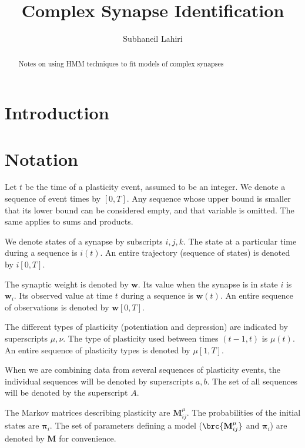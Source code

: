 \documentclass[12pt]{article}
\title{Complex Synapse Identification}%
\author{Subhaneil Lahiri}%
\newcommand{\pib}{\boldsymbol{\pi}}
\newcommand{\w}{\mathbf{w}}
\newcommand{\M}{\mathbf{M}}
\begin{document}
\maketitle
\begin{abstract}
  Notes on using HMM techniques to fit models of complex synapses
\end{abstract}

\section{Introduction \label{sec:intro}}






\section{Notation \label{sec:notation}}

Let $t$ be the time of a plasticity event, assumed to be an integer. 
We denote a sequence of event times by $[0,T]$.
Any sequence whose upper bound is smaller that its lower bound can be considered empty, and that variable is omitted.
The same applies to sums and products.

We denote states of a synapse by subscripts $i,j,k$. 
The state at a particular time during a sequence is $i(t)$.
An entire trajectory (sequence of states) is denoted by $i[0,T]$.

The synaptic weight is denoted by $\w$.
Its value when the synapse is in state $i$ is $\w_i$.
Its observed value at time $t$ during a sequence is $\w(t)$.
An entire sequence of observations is denoted by $\w[0,T]$.

The different types of plasticity (\eg potentiation and depression) are indicated by superscripts $\mu,\nu$.
The type of plasticity used between times $(t-1,t)$ is $\mu(t)$.
An entire sequence of plasticity types is denoted by $\mu[1,T]$.

When we are combining data from several sequences of plasticity events, the individual sequences will be denoted by superscripts $a,b$.
The set of all sequences will be denoted by the superscript $A$.

The Markov matrices describing plasticity are $\M^\mu_{ij}$.
The probabilities of the initial states are $\pib_i$.
The set of parameters defining a model (\ie $\brc{\M^\mu_{ij}}$ and $\pib_i$) are denoted by $\M$ for convenience.
\end{document}
